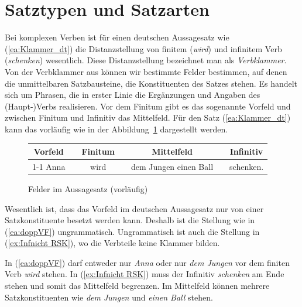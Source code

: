 \section{Satztypen und Satzarten}\label{sec:Satztypen_Satzarten}

Bei komplexen Verben ist für einen deutschen Aussagesatz wie (\ref{ea:Klammer_dt}) die Distanzstellung von finitem (\textit{wird}) und infinitem Verb (\textit{schenken}) wesentlich. Diese Distanzstellung bezeichnet man als \textit{Verbklammer}. Von der Verbklammer aus können wir bestimmte Felder bestimmen, auf denen die unmittelbaren Satzbausteine, die Konstituenten des Satzes stehen. Es handelt sich um Phrasen, die in erster Linie die Ergänzungen und Angaben des (Haupt-)Verbs realisieren. Vor dem Finitum gibt es das sogenannte Vorfeld und zwischen Finitum und Infinitiv das Mittelfeld. Für den Satz (\ref{ea:Klammer_dt}) kann das vorläufig wie in der Abbildung~\ref{fig:Felder_Aussagesatz} dargestellt werden.

\begin{figure}[!htbp]
  \centering
  \begin{tabular}{cp{0.1em}cp{0.1em}cp{0.1em}c}
    Vorfeld && Finitum && Mittelfeld && Infinitiv \\
    \cmidrule{1-1}\cmidrule{3-3}\cmidrule{5-5}\cmidrule{7-7}
    Anna && wird && dem Jungen einen Ball && schenken. \\
  \end{tabular}
  \caption{Felder im Aussagesatz (vorläufig)}
  \label{fig:Felder_Aussagesatz}
\end{figure}  

Wesentlich ist, dass das Vorfeld im deutschen Aussagesatz nur von einer Satzkonstituente besetzt werden kann. Deshalb ist die Stellung wie in (\ref{ea:doppVF}) ungrammatisch. Ungrammatisch ist auch die Stellung in (\ref{ex:Infnicht RSK}), wo die Verbteile keine Klammer bilden.

\ea \label{ea:VerstößeStellung}
\label{ea:doppVF}
\label{ex:Infnicht RSK}
\z 
\z 

In (\ref{ea:doppVF}) darf entweder nur \textit{Anna} oder nur \textit{dem Jungen} vor dem finiten Verb \textit{wird} stehen. In (\ref{ex:Infnicht RSK}) muss der Infinitiv \textit{schenken} am Ende stehen und somit das Mittelfeld begrenzen. Im Mittelfeld können mehrere Satzkonstituenten wie \zB \textit{dem Jungen} und \textit{einen Ball} stehen.

